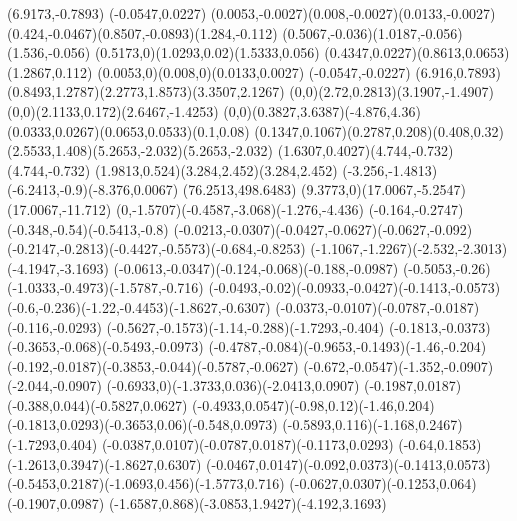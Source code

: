 {    \rlineto(6.9173,-0.7893)
    \rlineto(-0.0547,0.0227)
    \rcurveto(0.0053,-0.0027)(0.008,-0.0027)(0.0133,-0.0027)
    \rcurveto(0.424,-0.0467)(0.8507,-0.0893)(1.284,-0.112)
    \rcurveto(0.5067,-0.036)(1.0187,-0.056)(1.536,-0.056)
    \rcurveto(0.5173,0)(1.0293,0.02)(1.5333,0.056)
    \rcurveto(0.4347,0.0227)(0.8613,0.0653)(1.2867,0.112)
    \rcurveto(0.0053,0)(0.008,0)(0.0133,0.0027)
    \rlineto(-0.0547,-0.0227)
    \rlineto(6.916,0.7893)
    \rcurveto(0.8493,1.2787)(2.2773,1.8573)(3.3507,2.1267)
    \rcurveto(0,0)(2.72,0.2813)(3.1907,-1.4907)
    \rcurveto(0,0)(2.1133,0.172)(2.6467,-1.4253)
    \rcurveto(0,0)(0.3827,3.6387)(-4.876,4.36)
    \rcurveto(0.0333,0.0267)(0.0653,0.0533)(0.1,0.08)
    \rcurveto(0.1347,0.1067)(0.2787,0.208)(0.408,0.32)
    \rcurveto(2.5533,1.408)(5.2653,-2.032)(5.2653,-2.032)
    \rcurveto(1.6307,0.4027)(4.744,-0.732)(4.744,-0.732)
    \rcurveto(1.9813,0.524)(3.284,2.452)(3.284,2.452)
    \rcurveto(-3.256,-1.4813)(-6.2413,-0.9)(-8.376,0.0067)
    \moveto(76.2513,498.6483)
    \rcurveto(9.3773,0)(17.0067,-5.2547)(17.0067,-11.712)
    \rcurveto(0,-1.5707)(-0.4587,-3.068)(-1.276,-4.436)
    \rcurveto(-0.164,-0.2747)(-0.348,-0.54)(-0.5413,-0.8)
    \rcurveto(-0.0213,-0.0307)(-0.0427,-0.0627)(-0.0627,-0.092)
    \rcurveto(-0.2147,-0.2813)(-0.4427,-0.5573)(-0.684,-0.8253)
    \rcurveto(-1.1067,-1.2267)(-2.532,-2.3013)(-4.1947,-3.1693)
    \rcurveto(-0.0613,-0.0347)(-0.124,-0.068)(-0.188,-0.0987)
    \rcurveto(-0.5053,-0.26)(-1.0333,-0.4973)(-1.5787,-0.716)
    \rcurveto(-0.0493,-0.02)(-0.0933,-0.0427)(-0.1413,-0.0573)
    \rcurveto(-0.6,-0.236)(-1.22,-0.4453)(-1.8627,-0.6307)
    \rcurveto(-0.0373,-0.0107)(-0.0787,-0.0187)(-0.116,-0.0293)
    \rcurveto(-0.5627,-0.1573)(-1.14,-0.288)(-1.7293,-0.404)
    \rcurveto(-0.1813,-0.0373)(-0.3653,-0.068)(-0.5493,-0.0973)
    \rcurveto(-0.4787,-0.084)(-0.9653,-0.1493)(-1.46,-0.204)
    \rcurveto(-0.192,-0.0187)(-0.3853,-0.044)(-0.5787,-0.0627)
    \rcurveto(-0.672,-0.0547)(-1.352,-0.0907)(-2.044,-0.0907)
    \rcurveto(-0.6933,0)(-1.3733,0.036)(-2.0413,0.0907)
    \rcurveto(-0.1987,0.0187)(-0.388,0.044)(-0.5827,0.0627)
    \rcurveto(-0.4933,0.0547)(-0.98,0.12)(-1.46,0.204)
    \rcurveto(-0.1813,0.0293)(-0.3653,0.06)(-0.548,0.0973)
    \rcurveto(-0.5893,0.116)(-1.168,0.2467)(-1.7293,0.404)
    \rcurveto(-0.0387,0.0107)(-0.0787,0.0187)(-0.1173,0.0293)
    \rcurveto(-0.64,0.1853)(-1.2613,0.3947)(-1.8627,0.6307)
    \rcurveto(-0.0467,0.0147)(-0.092,0.0373)(-0.1413,0.0573)
    \rcurveto(-0.5453,0.2187)(-1.0693,0.456)(-1.5773,0.716)
    \rcurveto(-0.0627,0.0307)(-0.1253,0.064)(-0.1907,0.0987)
    \rcurveto(-1.6587,0.868)(-3.0853,1.9427)(-4.192,3.1693)
}
